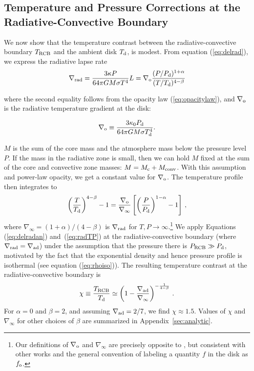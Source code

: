 \documentclass[apj]{emulateapj}
\newcommand{\delad}{\nabla_{\rm ad}}
\newcommand{\delrad}{\nabla_{\rm rad}}
\newcommand{\Eqs}[2]{Equations (\ref{#1}) and~(\ref{#2})}
\newcommand{\App}[1]{Appendix~\ref{#1}}
\newcommand{\co}{_{\rm c}}
\newcommand{\di}{_{\rm o}}
\newcommand{\cb}{_{\rm RCB}}
\begin{document}
\subsection{Temperature and Pressure Corrections at the Radiative-Convective Boundary}
\label{RCBcorr}

We now show that the temperature contrast between the radiative-convective boundary $T_{\rm RCB}$ and the ambient disk $T_{\rm d}$, is modest.  From equation (\ref{eq:delrad}), we express the radiative lapse rate
\begin{equation}\label{eq:delradan}
\delrad = {3 \kappa P \over 64 \pi  G M \sigma T^4} L = \nabla\di {(P/P_{\rm d})^{1+\alpha} \over (T/T_{\rm d})^{4-\beta}}
\end{equation}

\noindent where the second equality follows from the opacity law (\ref{eq:opacitylaw}), and $\nabla \di$ is the radiative temperature gradient at the disk:

\begin{equation}
\label{eq:delo}
\nabla \di \equiv \frac{3 \kappa_0 P_{\rm d}}{64 \pi G M \sigma T_{\rm d}^4}.
\end{equation}

\noindent $M$ is the sum of the core mass and the atmosphere mass below the pressure level $P$.  If the mass in the radiative zone is small, then we can hold $M$ fixed at the sum of the core and convective zone masses: $M = M\co + M_{\rm conv}$.   With this assumption and power-law opacity, we get a constant value for $\nabla\di$.  The temperature profile then integrates to
\begin{equation}\label{eq:radTP}
\left(T \over T_{\rm d}\right)^{4-\beta} - 1 = {\nabla\di \over \nabla_\infty} \left[\left({P \over P_{\rm d}}\right)^{1-\alpha} - 1 \right] \, ,
\end{equation} 
where $\nabla_\infty = (1+\alpha)/(4-\beta)$ is $\delrad$ for $T ,P \rightarrow \infty$.\footnote{Our definitions of $\nabla\di$ and $\nabla_\infty$ are precisely opposite to \citet{rafikov06}, but consistent with other works and the general convention of labeling a quantity $f$ in the disk as $f\di$.}
We  apply \Eqs{eq:delradan}{eq:radTP} at the radiative-convective boundary (where $\delrad = \delad$) under the assumption that the pressure there is $P\cb \gg P_{\rm d}$, motivated by the fact that the exponential density and hence pressure profile is isothermal (see equation (\ref{eq:rhoiso})). The resulting temperature contrast at the radiative-convective boundary is
\begin{equation}\label{eq:Tcb}
\chi \equiv {T\cb\over T_{\rm d}} \simeq \left(1 - {\nabla_{\rm ad} \over \nabla_\infty}\right)^{-\frac{1}{4-\beta}} \, .
\end{equation} 
For  $\alpha=0$ and $\beta =2$,  and assuming $\delad = 2/7$, we find $\chi \approx 1.5$. Values of $\chi$ and $\nabla_\infty$ for other choices of $\beta$ are summarized in \App{sec:analytic}.
\end{document}
